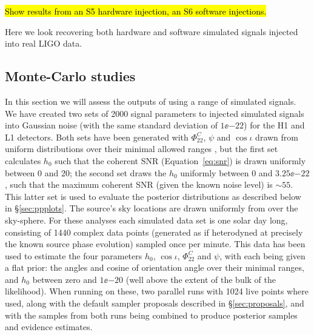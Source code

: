 \hl{Show results from an S5 hardware injection, an S6 software injections.}

Here we look recovering both hardware and software simulated signals injected into real LIGO data.

\subsection{Monte-Carlo studies}

In this section we will assess the outputs of \lppen using a range of simulated signals. We have created two sets of 2000 signal parameters to
injected simulated signals into Gaussian noise (with the same standard deviation of $1\ee{-22}$) for the H1 and L1 detectors. Both sets have been generated
with $\Phi_{22}^C$, $\psi$ and $\cos{\iota}$ drawn from uniform distributions over their minimal allowed ranges \citep[Table~1 of][]{2015MNRAS.453.4399P},
but the first set
calculates $h_0$ such that the coherent SNR (Equation~\ref{eq:snr}) is drawn uniformly between 0 and 20; the second set draws the $h_0$ uniformly between
0 and $3.25\ee{-22}$, such that the maximum coherent SNR (given the known noise level) is $\sim 55$. This latter set is used to evaluate the posterior
distributions as described below in \S\ref{sec:ppplots}. The source's sky locations are drawn uniformly from over the sky-sphere. For these analyses each
simulated data set is one solar day long, consisting of 1440 complex data points (generated as if heterodyned at precisely the known source phase evolution)
sampled once per minute. This data has been used to estimate the four parameters $h_0$, $\cos{\iota}$, $\Phi_{22}^C$ and $\psi$, with each being given
a flat prior: the angles and cosine of orientation angle over their minimal ranges, and $h_0$ between zero and $1\ee{-20}$ (well above the extent of the
bulk of the likelihood). When running \lppen on these, two parallel runs with 1024 live points where used, along with the default sampler proposals described
in \S\ref{sec:proposals}, and with the samples from both runs being combined to produce posterior samples and evidence estimates.

